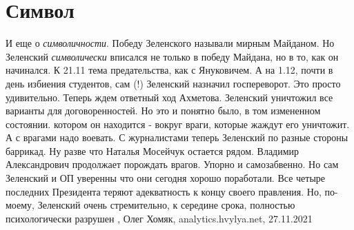  
 
 
 
 
\chapter{Символ}
\label{sec:slova.simvol}

И еще о \emph{символичности}. Победу Зеленского называли мирным Майданом. Но Зеленский
\emph{символически} вписался не только в победу Майдана, но в то, как он начинался. К
21.11 тема предательства, как с Януковичем. А на 1.12, почти в день избиения
студентов, сам (!) Зеленский назначил госпереворот. Это просто удивительно.
Теперь ждем ответный ход Ахметова. Зеленский уничтожил все варианты для
договоренностей. Но это и понятно было, в том измененном состоянии. котором он
находится - вокруг враги, которые жаждут его уничтожит. А с врагами надо
воевать.  С журналистами теперь Зеленский по разные стороны баррикад. Ну разве
что Наталья Мосейчук остается рядом.  Владимир Александрович продолжает
порождать врагов. Упорно и самозабвенно.  Но сам Зеленский и ОП уверенны что
они сегодня хорошо поработали.  Все четыре последних Президента теряют
адекватность к концу своего правления.  Но, по-моему, Зеленский очень
стремительно, к середине срока, полностью психологически разрушен
, 
Олег Хомяк, analytics.hvylya.net, 27.11.2021
